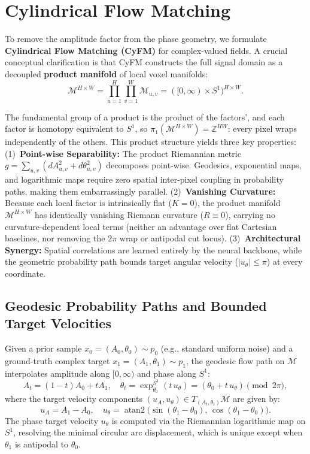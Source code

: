 \section{Cylindrical Flow Matching}
\label{sec:method}

To remove the amplitude factor from the phase geometry, we formulate \textbf{Cylindrical Flow Matching (CyFM)} for complex-valued fields. A crucial conceptual clarification is that CyFM constructs the full signal domain as a decoupled \textbf{product manifold} of local voxel manifolds:
\begin{equation}
    \mathcal{M}^{H \times W} = \prod_{u=1}^H \prod_{v=1}^W \mathcal{M}_{u, v} = ([0, \infty) \times S^1)^{H \times W}.
\end{equation}

The fundamental group of a product is the product of the factors', and each factor is homotopy equivalent to $S^1$, so $\pi_1(\mathcal{M}^{H \times W}) = \mathbb{Z}^{HW}$: every pixel wraps independently of the others. This product structure yields three key properties:
(1)~\textbf{Point-wise Separability:} The product Riemannian metric $g = \sum_{u, v} (dA_{u,v}^2 + d\theta_{u,v}^2)$ decomposes point-wise. Geodesics, exponential maps, and logarithmic maps require zero spatial inter-pixel coupling in probability paths, making them embarrassingly parallel.
(2)~\textbf{Vanishing Curvature:} Because each local factor is intrinsically flat ($K=0$), the product manifold $\mathcal{M}^{H \times W}$ has identically vanishing Riemann curvature ($R \equiv 0$), carrying no curvature-dependent local terms (neither an advantage over flat Cartesian baselines, nor removing the $2\pi$ wrap or antipodal cut locus).
(3)~\textbf{Architectural Synergy:} Spatial correlations are learned entirely by the neural backbone, while the geometric probability path bounds target angular velocity ($|u_\theta| \le \pi$) at every coordinate.

\subsection{Geodesic Probability Paths and Bounded Target Velocities}
Given a prior sample $x_0 = (A_0, \theta_0) \sim p_0$ (e.g., standard uniform noise) and a ground-truth complex target $x_1 = (A_1, \theta_1) \sim p_1$, the geodesic flow path on $\mathcal{M}$ interpolates amplitude along $[0, \infty)$ and phase along $S^1$:
\begin{equation}
    A_t = (1 - t) A_0 + t A_1, \quad \theta_t = \exp_{\theta_0}^{S^1}(t \, u_\theta) = (\theta_0 + t \, u_\theta) \pmod{2\pi},
\end{equation}
where the target velocity components $(u_A, u_\theta) \in T_{(A_t, \theta_t)}\mathcal{M}$ are given by:
\begin{equation}
    u_A = A_1 - A_0, \quad u_\theta = \operatorname{atan2}\big(\sin(\theta_1 - \theta_0),\, \cos(\theta_1 - \theta_0)\big).
\end{equation}
The phase target velocity $u_\theta$ is computed via the Riemannian logarithmic map on $S^1$, resolving the minimal circular arc displacement, which is unique except when $\theta_1$ is antipodal to $\theta_0$.


